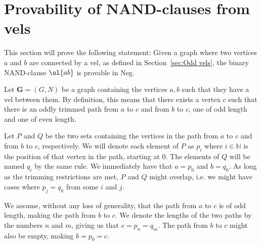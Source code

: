 
\section{Provability of NAND-clauses from vels}
\label{sec:Provability of NAND-clauses from vels}
This section will prove the following statement:
Given a graph where two vertices $a$ and $b$ are connected by a vel, as defined in Section~\ref{sec:Odd vels}, the binary NAND-clause $\ol{ab}$ is provable in Neg.

Let $\mathbf{G} = (G,N)$ be a graph containing the vertices $a,b$ such that they have a vel between them.
By definition, this means that there exists a vertex $c$ such that there is an oddly trimmed path from $a$ to $c$ and from $b$ to $c$, one of odd length and one of even length.

Let $P$ and $Q$ be the two sets containing the vertices in the path from $a$ to $c$ and from $b$ to $c$, respectively.
We will denote each element of $P$ as $p_i$ where $i \in \mathbb{N}$ is the position of that vertex in the path, starting at 0.
The elements of $Q$ will be named $q_i$ by the same rule.
We immediately have that $a = p_0$ and $b = q_0$.
As long as the trimming restrictions are met, $P$ and $Q$ might overlap, i.e. we might have cases where $p_j = q_k$ from some $i$ and $j$.

We assume, without any loss of generality, that the path from $a$ to $c$ is of odd length, making the path from $b$ to $c$.
We denote the lengths of the two paths by the numbers $n$ and $m$, giving us that $c = p_n = q_m$.
The path from $b$ to $c$ might also be empty, making $b = p_0 = c$.

